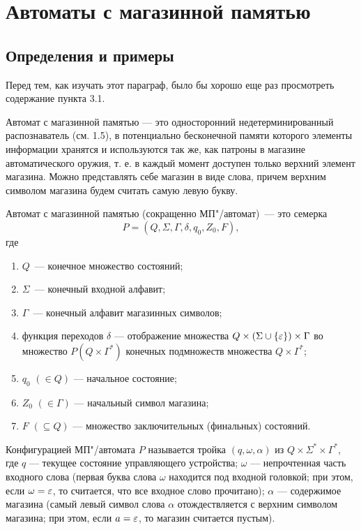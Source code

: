 \chapter{Автоматы с магазинной памятью}
\label{Chapter8FSMSM}
\section{Определения и примеры}
\label{Chapter8Defines}
Перед тем, как изучать этот параграф, было бы хорошо еще раз просмотреть содержание пункта 3.1.

Автомат с магазинной памятью --- это односторонний недетерминированный распознаватель (см. 1.5), в потенциально бесконечной памяти которого элементы информации хранятся и используются так же, как патроны в магазине автоматического оружия, т. е. в каждый момент доступен только верхний элемент магазина. Можно представлять себе магазин в виде слова, причем верхним символом магазина будем считать самую левую букву.

Автомат с магазинной памятью
(сокращенно МП"/автомат)~--- это семерка
\[P=
    (Q,\Sigma,\Gamma,\delta,q_0,Z_0,F),\]
где
\begin{enumerate}
\item $Q$~--- конечное множество состояний;

\item $\Sigma$~--- конечный входной алфавит;

\item $\Gamma$~--- конечный алфавит магазинных символов;

\item функция переходов $\delta$ ---
отображение множества $Q\times(\Sigma\cup\{\varepsilon\}) \times \Gamma$ во множество $P \left (Q \times \Gamma^* \right)$
конечных подмножеств множества $Q \times\Gamma^*$;

\item
$q_0$ $(\in Q)$ --- начальное состояние;

\item
$Z_0$ $(\in\Gamma)$ --- начальный символ
магазина;

\item
$F$ $(\subseteq Q)$ --- множество
заключительных (финальных) состояний.
\end{enumerate}


Конфигурацией МП"/автомата $P$ называется тройка $(q,\omega,\alpha)$ из $Q\times\Sigma^*\times\Gamma^*$, где $q$ --- текущее состояние управляющего устройства; $\omega$ --- непрочтенная часть входного слова (первая буква слова $\omega$ находится под входной головкой; при этом, если $\omega=\varepsilon$, то считается, что все входное слово прочитано); $\alpha$ --- содержимое магазина (самый левый символ слова $\alpha$ отождествляется с верхним символом магазина; при этом, если $a=\varepsilon$, то магазин считается пустым).

